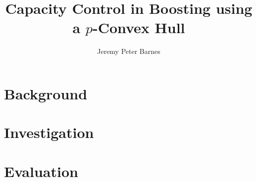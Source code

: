 \documentclass[a4paper,11pt,oneside]{book}
\title{Capacity Control in Boosting using a $p$-Convex Hull}
\author{Jeremy Peter Barnes}
\begin{document}
\frontmatter

\maketitle



\tableofcontents
\listoffigures
\listoftables

\renewcommand{\baselinestretch}{1.2}
\small\normalsize




\mainmatter



\part{Background}




\part{Investigation}




\part{Evaluation}




\appendix

\renewcommand{\baselinestretch}{1.0}
\small\normalsize






\backmatter



\end{document}
